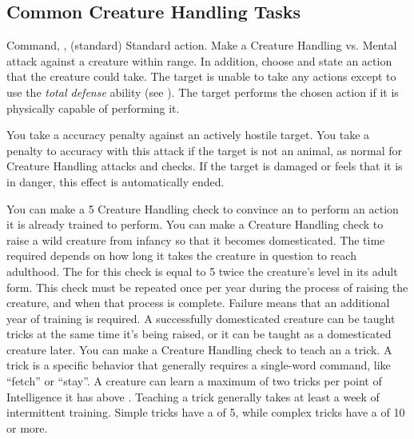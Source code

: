   \subsection{Common Creature Handling Tasks}

    \begin{sustainability}{Command}{, ,  (standard)}
      \abilityusagetime Standard action.
      \rankline
      Make a Creature Handling vs. Mental attack against a creature within \rngmed range.
      In addition, choose and state an action that the creature could take.
      \hit The target is unable to take any actions except to use the \textit{total defense} ability (see ).
      \crit The target performs the chosen action if it is physically capable of performing it.

      You take a  accuracy penalty against an actively hostile target.
      You take a  penalty to accuracy with this attack if the target is not an animal, as normal for Creature Handling attacks and checks.
      If the target is damaged or feels that it is in danger, this effect is automatically ended.
    \end{sustainability}
     You can make a  5 Creature Handling check to convince an  to perform an action it is already trained to perform.
     You can make a Creature Handling check to raise a wild creature from infancy so that it becomes domesticated.
    The time required depends on how long it takes the creature in question to reach adulthood.
    The  for this check is equal to 5 \add twice the creature's level in its adult form.
    This check must be repeated once per year during the process of raising the creature, and when that process is complete.
    Failure means that an additional year of training is required.
    A successfully domesticated creature can be taught tricks at the same time it's being raised, or it can be taught as a domesticated creature later.
     You can make a Creature Handling check to teach an  a trick.
    A trick is a specific behavior that generally requires a single-word command, like ``fetch'' or ``stay''.
    A creature can learn a maximum of two tricks per point of Intelligence it has above .
    Teaching a trick generally takes at least a week of intermittent training.
    Simple tricks have a  of 5, while complex tricks have a  of 10 or more.

